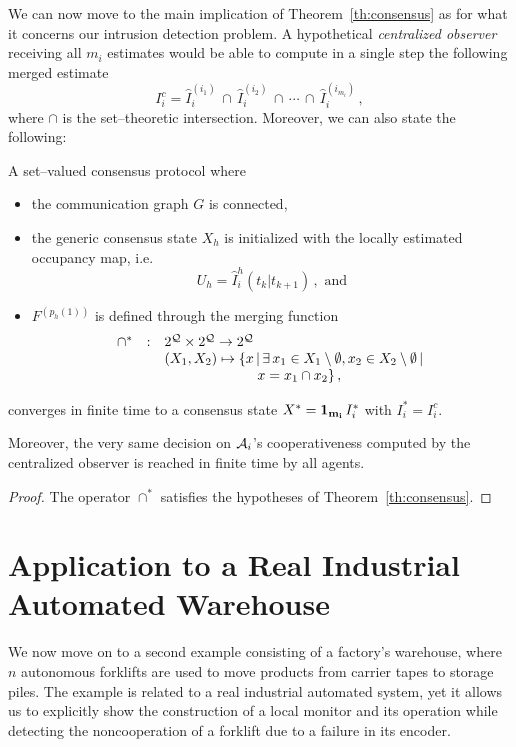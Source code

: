 \documentclass[journal, onecolumn, 12pt]{styles/IEEEtran}
\begin{document}
We can now move to the main implication of Theorem~\ref{th:consensus} as for what it concerns our intrusion detection problem. A hypothetical {\em centralized observer} receiving all $m_i$ estimates would be able to compute in a single step the following merged estimate
$$
I_i^c = \hat{I}_i^{(i_1)} \, \cap \, \hat{I}_i^{(i_2)} \, \cap \, \cdots \, \cap \, \hat{I}_i^{(i_{m_i})} \, ,
$$ 
where $\cap$ is the set--theoretic intersection. Moreover, we can also state the following:
\begin{corollary}
A set--valued consensus protocol where 
\begin{itemize}
\item
the communication graph $G$ is connected, 
\item
the generic consensus state $X_h$ is initialized with the locally estimated occupancy map, i.e. 
$$
U_h = \hat{I}_i^h(t_k|t_{k+1}) \, , \mbox{ and}
$$
\item
$F^{(p_h(1))}$ is defined through the merging function
$$
\begin{array}{rcl}
\cap^* & : & 2^{\mathcal{Q}}  \times 2^{\mathcal{Q}}  \rightarrow 2^{\mathcal{Q}}  \\
& & (X_1, X_2) \mapsto \{ x \, | \, \exists \, x_1 \in X_1 \setminus \emptyset, x_2 \in X_2 \setminus \emptyset \, | \, \\
& & \;\;\;\;\;\;\;\;\;\;\;\;\;\;\;\;\;\;\;\;\;\;\;\; x = x_1 \cap x_2 \}
\, ,
\end{array}
$$
\end{itemize}
converges in finite time to a consensus state $X^*={\bf 1_{m_i}} \, I_i^*$ with $I_i^* = I_i^c$.

Moreover, the very same decision on $\mathcal{A}_i$'s cooperativeness computed by the centralized observer is reached in finite time by all agents.
\begin{proof}
The operator $\cap^*$ satisfies the hypotheses of Theorem~\ref{th:consensus}.
\end{proof}
\end{corollary}

%
%
%



%
%
%


\section{Application to a Real Industrial Automated Warehouse}
\label{sec:example:warehouse}

We now move on to a second example consisting of a factory's warehouse, where $n$ autonomous forklifts are used to move products from carrier tapes to storage piles. The example is related to a real industrial automated system, yet it allows us to explicitly show the construction of a local monitor and its operation while detecting the noncooperation of a forklift due to a failure in its encoder.
\end{document}
